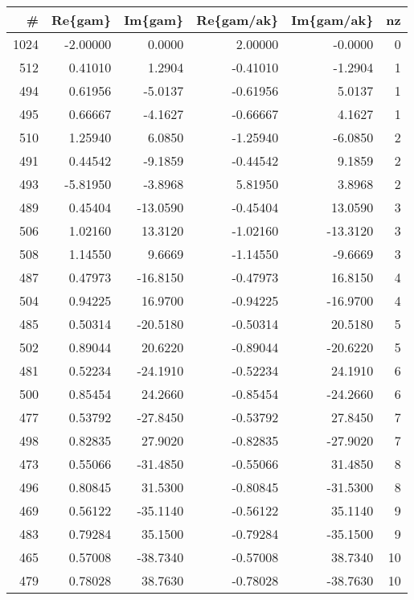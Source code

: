 \small \begin{tabular}{rrrrrr}
\toprule
   \# &  Re\{gam\} &  Im\{gam\} &  Re\{gam/ak\} &  Im\{gam/ak\} &  nz \\
\midrule
1024 & -2.00000 &   0.0000 &     2.00000 &     -0.0000 &   0 \\
 512 &  0.41010 &   1.2904 &    -0.41010 &     -1.2904 &   1 \\
 494 &  0.61956 &  -5.0137 &    -0.61956 &      5.0137 &   1 \\
 495 &  0.66667 &  -4.1627 &    -0.66667 &      4.1627 &   1 \\
 510 &  1.25940 &   6.0850 &    -1.25940 &     -6.0850 &   2 \\
 491 &  0.44542 &  -9.1859 &    -0.44542 &      9.1859 &   2 \\
 493 & -5.81950 &  -3.8968 &     5.81950 &      3.8968 &   2 \\
 489 &  0.45404 & -13.0590 &    -0.45404 &     13.0590 &   3 \\
 506 &  1.02160 &  13.3120 &    -1.02160 &    -13.3120 &   3 \\
 508 &  1.14550 &   9.6669 &    -1.14550 &     -9.6669 &   3 \\
 487 &  0.47973 & -16.8150 &    -0.47973 &     16.8150 &   4 \\
 504 &  0.94225 &  16.9700 &    -0.94225 &    -16.9700 &   4 \\
 485 &  0.50314 & -20.5180 &    -0.50314 &     20.5180 &   5 \\
 502 &  0.89044 &  20.6220 &    -0.89044 &    -20.6220 &   5 \\
 481 &  0.52234 & -24.1910 &    -0.52234 &     24.1910 &   6 \\
 500 &  0.85454 &  24.2660 &    -0.85454 &    -24.2660 &   6 \\
 477 &  0.53792 & -27.8450 &    -0.53792 &     27.8450 &   7 \\
 498 &  0.82835 &  27.9020 &    -0.82835 &    -27.9020 &   7 \\
 473 &  0.55066 & -31.4850 &    -0.55066 &     31.4850 &   8 \\
 496 &  0.80845 &  31.5300 &    -0.80845 &    -31.5300 &   8 \\
 469 &  0.56122 & -35.1140 &    -0.56122 &     35.1140 &   9 \\
 483 &  0.79284 &  35.1500 &    -0.79284 &    -35.1500 &   9 \\
 465 &  0.57008 & -38.7340 &    -0.57008 &     38.7340 &  10 \\
 479 &  0.78028 &  38.7630 &    -0.78028 &    -38.7630 &  10 \\

\end{tabular}
